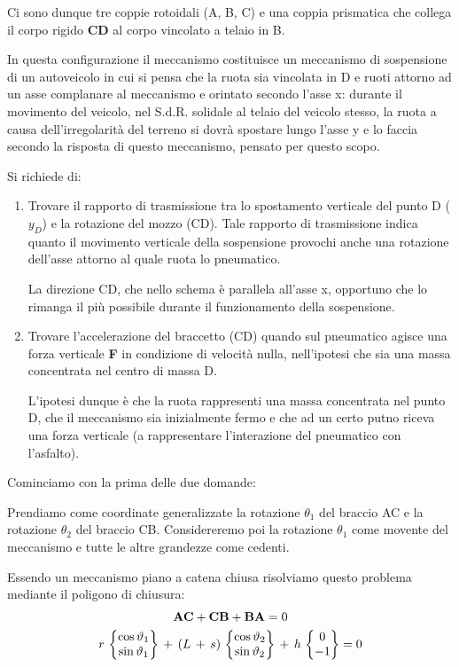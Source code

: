 Ci sono  dunque tre coppie rotoidali (A, B, C) e una coppia prismatica che collega il corpo rigido \textbf{CD} al corpo vincolato a telaio in B. 

In questa configurazione il meccanismo costituisce un meccanismo di sospensione di un autoveicolo in cui si pensa che la ruota sia vincolata in D e ruoti attorno ad un asse complanare al meccanismo e orintato secondo l'asse x: durante il movimento del veicolo, nel S.d.R. solidale al telaio del veicolo stesso, la ruota a causa dell'irregolarità del terreno si dovrà spostare lungo l'asse y e lo faccia secondo la risposta di questo meccanismo, pensato per questo scopo.

Si richiede di:
\begin{enumerate}
\item Trovare il rapporto di trasmissione tra lo spostamento verticale del punto D ($y_D$) e la rotazione del mozzo (CD). Tale rapporto di trasmissione indica quanto il movimento verticale della sospensione provochi anche una rotazione dell'asse attorno al quale ruota lo pneumatico. 

La direzione CD, che nello schema è parallela all'asse x, opportuno che lo rimanga il più possibile durante il funzionamento della sospensione.
\item Trovare l'accelerazione del braccetto (CD) quando sul pneumatico agisce una forza verticale \textbf{F} in condizione di velocità nulla, nell'ipotesi che sia una massa concentrata nel centro di massa D.

L'ipotesi dunque è che la ruota rappresenti una massa concentrata nel punto D, che il meccanismo sia inizialmente fermo e che ad un certo putno riceva una forza verticale (a rappresentare l'interazione del pneumatico con l'asfalto).
\end{enumerate}

Cominciamo con la prima delle due domande:

Prendiamo come coordinate generalizzate la rotazione $\theta_1$ del braccio AC e la rotazione $\theta_2$ del braccio CB. Considereremo poi la rotazione $\theta_1$ come movente del meccanismo e tutte le altre grandezze come cedenti.

Essendo un meccanismo piano a catena chiusa risolviamo questo problema mediante il poligono di chiusura:
\begin{gather*}
\mathbf{AC} + \mathbf{CB} + \mathbf{BA} = 0\\
r\,\begin{Bmatrix}\cos{\vartheta_1}\\\sin{\vartheta_1}\end{Bmatrix}\,+\,(L\,+\,s)\,\begin{Bmatrix}\cos{\vartheta_2}\\\sin{\vartheta_2}\end{Bmatrix}\,+\,h\,\begin{Bmatrix}0\\-1\end{Bmatrix} = 0
\end{gather*}

